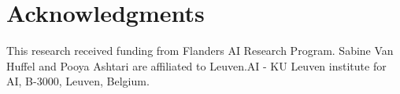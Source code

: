 \section*{Acknowledgments}

This research received funding from Flanders AI Research Program. Sabine Van Huffel and Pooya Ashtari are affiliated to Leuven.AI - KU Leuven institute for AI, B-3000, Leuven, Belgium.